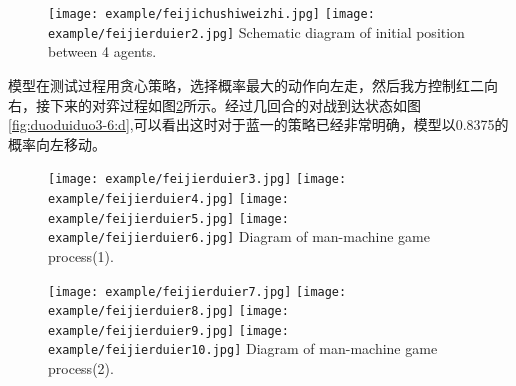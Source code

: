 \begin{figure}[htbp]
	\centering
	\subcaptionbox{\label{fig:duoduiduo1-2:a}}
	{\texttt{[image: example/feijichushiweizhi.jpg]}}
	\hspace{0.5em}
	\subcaptionbox{\label{fig:duoduiduo1-2:b}}
	{\texttt{[image: example/feijierduier2.jpg]}}
	{Schematic diagram of initial position between 4 agents.}
	\label{fig:duoduiduo1-2}
\end{figure}

模型在测试过程用贪心策略，选择概率最大的动作向左走，然后我方控制红二向右，接下来的对弈过程如图\ref{fig:duoduiduo3-6}所示。经过几回合的对战到达状态如图\ref{fig:duoduiduo3-6:d},可以看出这时对于蓝一的策略已经非常明确，模型以0.8375的概率向左移动。

\begin{figure}[htbp]
	\centering
	\subcaptionbox{\label{fig2:fig:duoduiduo3-6:a}}
	{\texttt{[image: example/feijierduier3.jpg]}}
	\hspace{0.5em}
	\subcaptionbox{\label{fig:duoduiduo3-6:b}}
	{\texttt{[image: example/feijierduier4.jpg]}}
	\newline
	\centering
	\subcaptionbox{\label{fig:duoduiduo3-6:c}}
	{\texttt{[image: example/feijierduier5.jpg]}}
	\hspace{0.5em}
	\subcaptionbox{\label{fig:duoduiduo3-6:d}}
	{\texttt{[image: example/feijierduier6.jpg]}}
	{Diagram of man-machine game process(1).}
	\label{fig:duoduiduo3-6}
\end{figure}
\begin{figure}[htbp]
	\centering
	\subcaptionbox{\label{fig:duoduiduo9-10:a}}
	{\texttt{[image: example/feijierduier7.jpg]}}
	\hspace{0.5em}
	\subcaptionbox{\label{fig:duoduiduo9-10:b}}
	{\texttt{[image: example/feijierduier8.jpg]}}
	\newline
	\centering
	\subcaptionbox{\label{fig2:fig:duoduiduo9-10:c}}
	{\texttt{[image: example/feijierduier9.jpg]}}
	\hspace{0.5em}
	\subcaptionbox{\label{fig:duoduiduo9-10:d}}
	{\texttt{[image: example/feijierduier10.jpg]}}
	{Diagram of man-machine game process(2).}
	\label{fig:duoduiduo9-10}
\end{figure}

